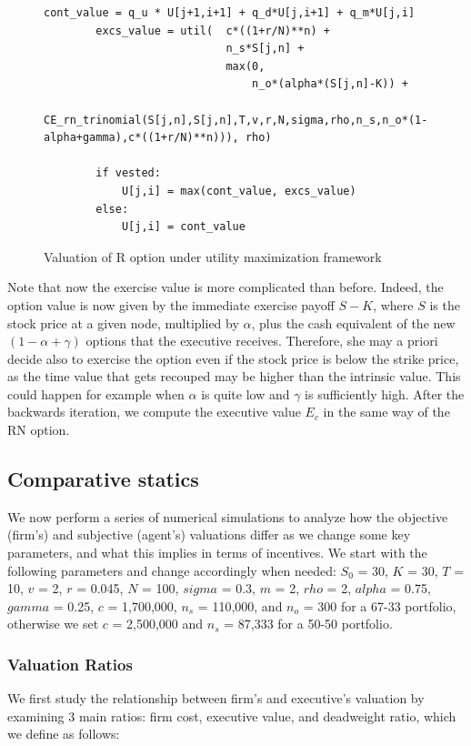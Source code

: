 \begin{figure}[H]
    \begin{lstlisting}[breaklines, basicstyle=\ttfamily\small]
        cont_value = q_u * U[j+1,i+1] + q_d*U[j,i+1] + q_m*U[j,i]
        excs_value = util(  c*((1+r/N)**n) +              
                            n_s*S[j,n] + 
                            max(0, 
                                n_o*(alpha*(S[j,n]-K)) + 
                                CE_rn_trinomial(S[j,n],S[j,n],T,v,r,N,sigma,rho,n_s,n_o*(1-alpha+gamma),c*((1+r/N)**n))), rho)

        if vested:
            U[j,i] = max(cont_value, excs_value)
        else: 
            U[j,i] = cont_value
    \end{lstlisting}
    \caption{Valuation of R option under utility maximization framework}
    \label{fig:ce_exec_r}
\end{figure}



Note that now the exercise value is more complicated than before. Indeed, the option value is now given by the immediate exercise payoff $S-K$, where $S$ is the stock price at a given node, multiplied by $\alpha$, plus the cash equivalent of the new $(1-\alpha+\gamma)$ options that the executive receives. Therefore, she may a priori decide also to exercise the option even if the stock price is below the strike price, as the time value that gets recouped may be higher than the intrinsic value. This could happen for example when $\alpha$ is quite low and $\gamma$ is sufficiently high. 
After the backwards iteration, we compute the executive value $E_c$ in the same way of the RN option.

\subsection{Comparative statics}
We now perform a series of numerical simulations to analyze how the objective (firm's) and subjective (agent's) valuations differ as we change some key parameters, and what this implies in terms of incentives. We start with the following parameters and change accordingly when needed: $S_0$ = 30, $K$ = 30, $T$ = 10, $v$ = 2, $r$ = 0.045, $N$ = 100, $sigma$ = 0.3, $m$ = 2, $rho$ = 2, $alpha$ = 0.75, $gamma$ = 0.25, $c$ = 1,700,000, $n_s$ = 110,000, and $n_o$ = 300 for a 67-33 portfolio, otherwise we set $c$ = 2,500,000 and $n_s$ = 87,333 for a 50-50 portfolio.

\subsubsection*{Valuation Ratios}
We first study the relationship between firm's and executive's valuation by examining 3 main ratios: firm cost, executive value, and deadweight ratio, which we define as follows:

